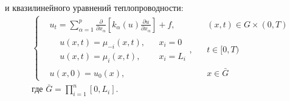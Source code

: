 и квазилинейного уравнений теплопроводности:
\begin{equation*}
    \begin{aligned}
        &\left\{ 
            \begin{aligned}
                & u_t = \sum\limits_{\alpha = 1}^{p} \frac{\partial }{\partial x_{\alpha}} \left[ 
                    k_{\alpha}(u) \frac{\partial u}{\partial x_{\alpha}}
                 \right] + f, && (x, t) \in G \times (0, T)\\
                & \begin{aligned}
                    & u(x, t) = \mu_{-i}(x, t), && x_i = 0\\
                    & u(x, t) = \mu_{i}(x, t), && x_i = L_i
                \end{aligned}, && t \in [0, T)\\
                &u(x, 0) = u_0(x), && x \in \bar{G}
            \end{aligned}
        \right.\\
        &\text{где } \bar{G} = \prod\limits_{i=1}^{n} [0, L_i].
    \end{aligned}
\end{equation*}
